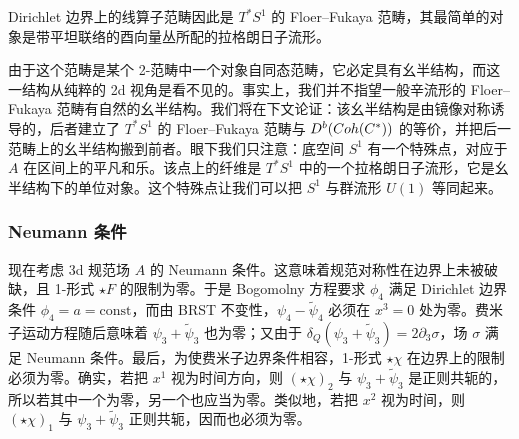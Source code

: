

Dirichlet 边界上的线算子范畴因此是 $T^*S^1$ 的 Floer--Fukaya 范畴，其最简单的对象是带平坦联络的酉向量丛所配的拉格朗日子流形。

由于这个范畴是某个 2-范畴中一个对象自同态范畴，它必定具有幺半结构，而这一结构从纯粹的 2d 视角是看不见的。事实上，我们并不指望一般辛流形的 Floer--Fukaya 范畴有自然的幺半结构。我们将在下文论证：该幺半结构是由镜像对称诱导的，后者建立了 $T^*S^1$ 的 Floer--Fukaya 范畴与 $D^b(Coh(C^*))$ 的等价，并把后一范畴上的幺半结构搬到前者。眼下我们只注意：底空间 $S^1$ 有一个特殊点，对应于 $A$ 在区间上的平凡和乐。该点上的纤维是 $T^*S^1$ 中的一个拉格朗日子流形，它是幺半结构下的单位对象。这个特殊点让我们可以把 $S^1$ 与群流形 $U(1)$ 等同起来。


\subsubsection{Neumann 条件}

现在考虑 3d 规范场 $A$ 的 Neumann 条件。这意味着规范对称性在边界上未被破缺，且 1-形式 $\star F$ 的限制为零。于是 Bogomolny 方程要求 $\phi_4$ 满足 Dirichlet 边界条件 $\phi_4=a=\mathrm{const}$，而由 BRST 不变性，$\psi_4-\tilde\psi_4$ 必须在 $x^3=0$ 处为零。费米子运动方程随后意味着 $\psi_3+\tilde\psi_3$ 也为零；又由于 $\delta_Q(\psi_3+\tilde\psi_3)=2\partial_3\sigma$，场 $\sigma$ 满足 Neumann 条件。最后，为使费米子边界条件相容，1-形式 $\star\chi$ 在边界上的限制必须为零。确实，若把 $x^1$ 视为时间方向，则 $(\star\chi)_2$ 与 $\psi_3+\tilde\psi_3$ 是正则共轭的，所以若其中一个为零，另一个也应当为零。类似地，若把 $x^2$ 视为时间，则 $(\star\chi)_1$ 与 $\psi_3+\tilde\psi_3$ 正则共轭，因而也必须为零。

